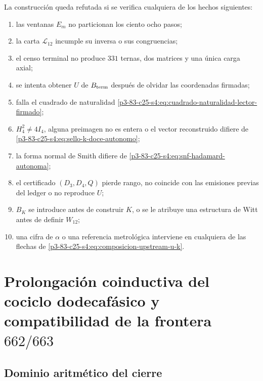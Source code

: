 \begin{remark}
La construcción queda refutada si se verifica cualquiera de los hechos
siguientes:
\begin{enumerate}
 \item las ventanas \(E_m\) no particionan los ciento ocho pasos;
 \item la carta \(\mathcal L_{12}\) incumple su inversa o sus congruencias;
 \item el censo terminal no produce \(331\) ternas, dos matrices y una única
       carga axial;
 \item se intenta obtener \(U\) de \(B_{\rm term}\) después de olvidar las
       coordenadas firmadas;
 \item falla el cuadrado de naturalidad
       \eqref{p3-83-c25-s4:eq:cuadrado-naturalidad-lector-firmado};
 \item \(H_4^2\neq4I_4\), alguna preimagen no es entera o el vector
       reconstruido difiere de \eqref{p3-83-c25-s4:eq:sello-k-doce-autonomo};
 \item la forma normal de Smith difiere de
       \eqref{p3-83-c25-s4:eq:snf-hadamard-autonoma};
 \item el certificado \((D_3,D_4,Q)\) pierde rango, no coincide con las
       emisiones previas del ledger o no reproduce \(U\);
 \item \(B_K\) se introduce antes de construir \(K\), o se le atribuye una
       estructura de Witt antes de definir \(W_{12}\);
 \item una cifra de \(\alpha\) o una referencia metrológica interviene en
       cualquiera de las flechas de \eqref{p3-83-c25-s4:eq:composicion-upstream-u-k}.
\end{enumerate}
\end{remark}



\section{Prolongación coinductiva del cociclo dodecafásico y compatibilidad de la frontera \texorpdfstring{\(662/663\)}{662/663}}
\label{p3-83-c25-s5:chap:acarreo-alpha-frontera-662-663}

\subsection{Dominio aritmético del cierre}

